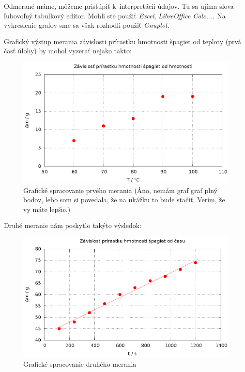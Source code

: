 Odmerané máme, môžeme pristúpiť k~interpretácii údajov. Tu sa ujíma slova ľubovoľný tabuľkový editor. Mohli ste použiť {\it Excel}, {\it LibreOffice Calc},$\,$... Na vykreslenie grafov sme sa však rozhodli použiť {\it Gnuplot}.

Grafický výstup merania závislosti prírastku hmotnosti špagiet od teploty (prvá časť úlohy) by mohol vyzerať nejako takto: 

\begin{figure}[h]
\centering 
\includegraphics[scale=0.8]{graaf1.eps}
\caption{Grafické spracovanie prvého merania (Áno, nemám graf graf plný bodov, lebo som si povedala, že na ukážku to bude stačiť. Verím, že vy máte lepšie.)}
\end{figure}

\newpage

Druhé meranie nám poskytlo takýto výsledok:

\begin{figure}[h]
\centering
\includegraphics[scale=0.8]{graaf2.eps}
\caption{Grafické spracovanie druhého merania}
\end{figure}

